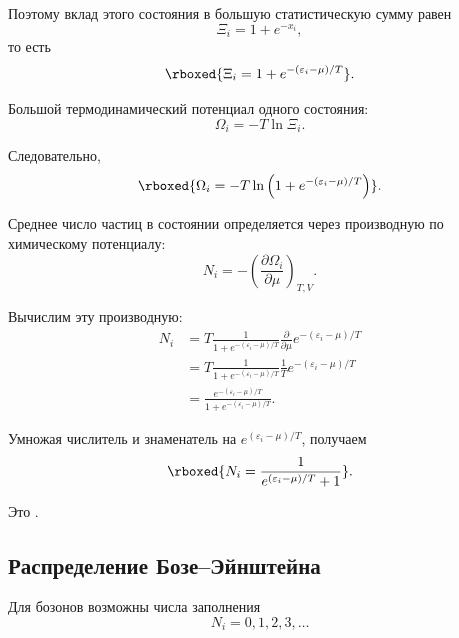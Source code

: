 \documentclass[../final.tex]{subfiles}
\begin{document}
Поэтому вклад этого состояния в большую статистическую сумму равен
%
\begin{equation*}
    \Xi_i
    =
    1+e^{-x_i},
\end{equation*}
%
то есть
%
\[
    \rboxed{
        \Xi_i
        =
        1
        +
        e^{-(\varepsilon_i-\mu)/T}
    }.
\]

Большой термодинамический потенциал одного состояния:
%
\begin{equation*}
    \Omega_i
    =
    -T\ln\Xi_i.
\end{equation*}

Следовательно,
%
\[
    \rboxed{
        \Omega_i
        =
        -T
        \ln
        \left(
            1
            +
            e^{-(\varepsilon_i-\mu)/T}
        \right)
    }.
\]

Среднее число частиц в состоянии определяется через производную
по химическому потенциалу:
%
\begin{equation*}
    N_i
    =
    -
    \left(
        \frac{\partial\Omega_i}{\partial\mu}
    \right)_{T,V}.
\end{equation*}

Вычислим эту производную:
%
\begin{align*}
    N_i
    &=
    T
    \frac{1}{
        1+e^{-(\varepsilon_i-\mu)/T}
    }
    \frac{\partial}{\partial\mu}
    e^{-(\varepsilon_i-\mu)/T}
    \\[4pt]
    &=
    T
    \frac{1}{
        1+e^{-(\varepsilon_i-\mu)/T}
    }
    \frac{1}{T}
    e^{-(\varepsilon_i-\mu)/T}
    \\[4pt]
    &=
    \frac{
        e^{-(\varepsilon_i-\mu)/T}
    }{
        1+e^{-(\varepsilon_i-\mu)/T}
    }.
\end{align*}

Умножая числитель и знаменатель на
$e^{(\varepsilon_i-\mu)/T}$, получаем
%
\[
    \rboxed{
        N_i
        =
        \frac{1}{
            e^{(\varepsilon_i-\mu)/T}+1
        }
    }.
\]

Это .


\subsection{Распределение Бозе--Эйнштейна}

Для бозонов возможны числа заполнения
%
\begin{equation*}
    N_i
    =
    0,1,2,3,\ldots
\end{equation*}
\end{document}
